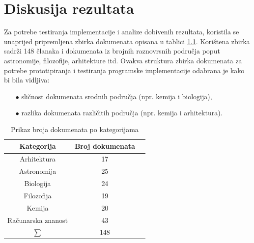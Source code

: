 \documentclass[times, utf8, zavrsni]{fer}
\begin{document}
\chapter{Diskusija rezultata}
Za potrebe testiranja implementacije i analize dobivenih rezultata, koristila se unaprijed pripremljena zbirka dokumenata opisana u tablici \ref{table:datasetinfo}. Korištena zbirka sadrži 148 članaka i dokumenata iz brojnih raznovrsnih područja poput astronomije, filozofije, arhitekture itd. Ovakva struktura zbirka dokumenata za potrebe prototipiranja i testiranja programske implementacije odabrana je kako bi bila vidljiva:
\begin{itemize}
\item[$\bullet$] sličnost dokumenata srodnih područja (npr. kemija i biologija),
\item[$\bullet$] razlika dokumenata različitih područja (npr. kemija i arhitektura).
\end{itemize}

\begin{table}
\begin{center}
\begin{tabular}{|c|c|c|}
\hline
Kategorija & Broj dokumenata \\
\hline
Arhitektura & 17 \\
Astronomija & 25 \\
Biologija & 24 \\
Filozofija & 19 \\
Kemija & 20 \\
Računarska znanost & 43 \\
\hline
$\sum$ & 148 \\
\hline
\end{tabular}
\end{center}
\caption{Prikaz broja dokumenata po kategorijama}
\label{table:datasetinfo}
\end{table}
\end{document}
